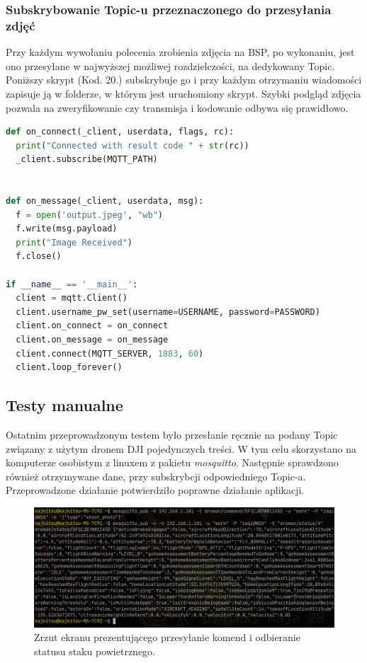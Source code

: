 \subsubsection{Subskrybowanie Topic-u przeznaczonego do przesyłania zdjęć}

Przy każdym wywołaniu polecenia zrobienia zdjęcia na BSP, po wykonaniu, jest ono przesyłane w najwyższej możliwej rozdzielczości, na dedykowany Topic. Poniższy skrypt (Kod. 20.) subskrybuje go i przy każdym otrzymaniu wiadomości zapisuje ją w folderze, w którym jest uruchomiony skrypt. Szybki podgląd zdjęcia pozwala na zweryfikowanie czy transmisja i kodowanie odbywa się prawidłowo.


\begin{lstlisting}[language=Python, caption=Skrypt nasuchujący na podanym topicu MQTT i zapisujący dane z wiadomości MQTT w formacie /text{jpeg}]
def on_connect(_client, userdata, flags, rc):
  print("Connected with result code " + str(rc))
  _client.subscribe(MQTT_PATH)


def on_message(_client, userdata, msg):
  f = open('output.jpeg', "wb")
  f.write(msg.payload)
  print("Image Received")
  f.close()

if __name__ == '__main__':
  client = mqtt.Client()
  client.username_pw_set(username=USERNAME, password=PASSWORD)
  client.on_connect = on_connect
  client.on_message = on_message
  client.connect(MQTT_SERVER, 1883, 60)
  client.loop_forever()

\end{lstlisting}

\newpage
\subsection{Testy manualne}
Ostatnim przeprowadzonym testem było przesłanie ręcznie na podany Topic związany z użytym dronem DJI pojedynczych treści. W tym celu skorzystano na komputerze osobistym z linuxem z pakietu \textit{mosquitto}. Następnie sprawdzono również otrzymywane dane, przy subskrybcji odpowiedniego Topic-a. Przeprowadzone działanie potwierdziło poprawne działanie aplikacji.

\begin{figure}[!ht]
\begin{center}
  \includegraphics[width=15cm]{./Obrazy/exece.png}
  \caption{Zrzut ekranu prezentującego przesyłanie komend i odbieranie statusu staku powietrznego.}
\end{center}
\end{figure}~


